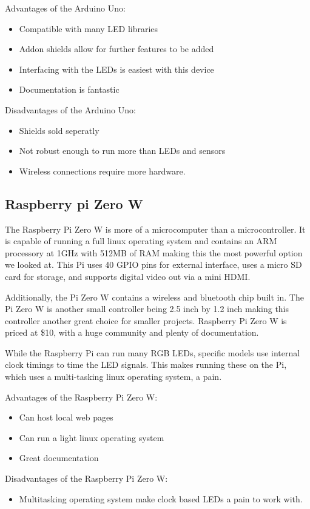 \documentclass[onecolumn, draftclsnofoot,10pt, compsoc]{IEEEtran}
\begin{document}
		\vspace{5mm}
		Advantages of the Arduino Uno:
		\begin{itemize}
			\item Compatible with many LED libraries
			\item Addon shields allow for further features to be added
			\item Interfacing with the LEDs is easiest with this device
			\item Documentation is fantastic
		\end{itemize}
		Disadvantages of the Arduino Uno:
		\begin{itemize}
			\item Shields sold seperatly
			\item Not robust enough to run more than LEDs and sensors
			\item Wireless connections require more hardware.
		\end{itemize}
		\subsection{Raspberry pi Zero W}

		\vspace{5mm}
		\noindent The Raspberry Pi Zero W is more of a microcomputer than a microcontroller.
		It is capable of running a full linux operating system and
		contains an ARM processory at 1GHz with 512MB of RAM making this the most
		powerful option we looked at. This Pi uses 40 GPIO pins for
		external interface, uses a micro SD card for storage, and supports digital
		video out via a mini HDMI\cite[Pg 7]{pizero}.

		\vspace{5mm}
		\noindent Additionally, the Pi Zero W contains a wireless and bluetooth chip built in.
		The Pi Zero W is another small controller being 2.5 inch by 1.2 inch
		making this controller another great choice for smaller projects.
		Raspberry Pi Zero W is priced at \$10, with a huge community and plenty of documentation.

		\vspace{5mm}
		\noindent While the Raspberry Pi can run many RGB LEDs, specific models use internal
		clock timings to time the LED signals. This makes running these on the Pi,
		which uses a multi-tasking linux operating system, a pain.

		\vspace{5mm}
		\noindent Advantages of the Raspberry Pi Zero W:
		\begin{itemize}
			\item Can host local web pages
			\item Can run a light linux operating system
			\item Great documentation
		\end{itemize}
		Disadvantages of the Raspberry Pi Zero W:
		\begin{itemize}
			\item Multitasking operating system make clock based LEDs a pain to
			work with.
		\end{itemize}
\end{document}
